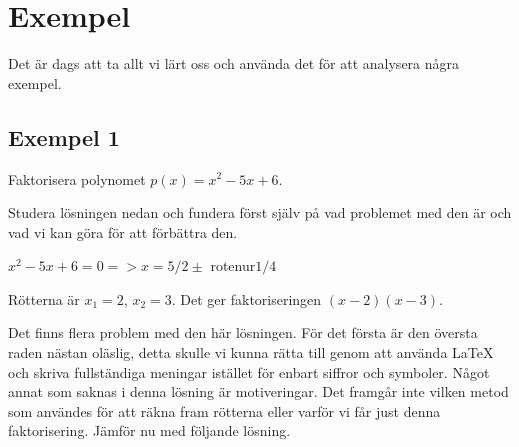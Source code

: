 \documentclass[titlepage]{article}
\begin{document}

\section{Exempel}


Det är dags att ta allt vi lärt oss och använda det för att analysera några exempel.

\subsection*{Exempel 1}

\begin{center}
\begin{tcolorbox}[width=\linewidth,colback={white},title={\textbf{Problem}},outer arc=0mm,colupper=black]
    Faktorisera polynomet $p(x)=x^2-5x+6$.
\end{tcolorbox} 
\end{center}

Studera lösningen nedan och fundera först själv på vad problemet med den är och vad vi kan göra för att förbättra den.

\begin{center}
\begin{tcolorbox}[width=\linewidth,colback={red!15!white},title={\textbf{Lösning 1 - Sämre}},outer arc=0mm,colupper=black]
    $x^2-5x+6 = 0 => x=5/2 \pm$ rotenur$1/4$

    Rötterna är $x_1 = 2$, $x_2 = 3$. Det ger faktoriseringen $(x-2)(x-3)$.
\end{tcolorbox} 
\end{center}

Det finns flera problem med den här lösningen. För det första är den översta raden nästan oläslig, detta skulle vi kunna rätta till genom att använda \LaTeX$\:$ och skriva fullständiga meningar istället för enbart siffror och symboler. Något annat som saknas i denna lösning är motiveringar. Det framgår inte vilken metod som användes för att räkna fram rötterna eller varför vi får just denna faktorisering. Jämför nu med följande lösning.
\end{document}

